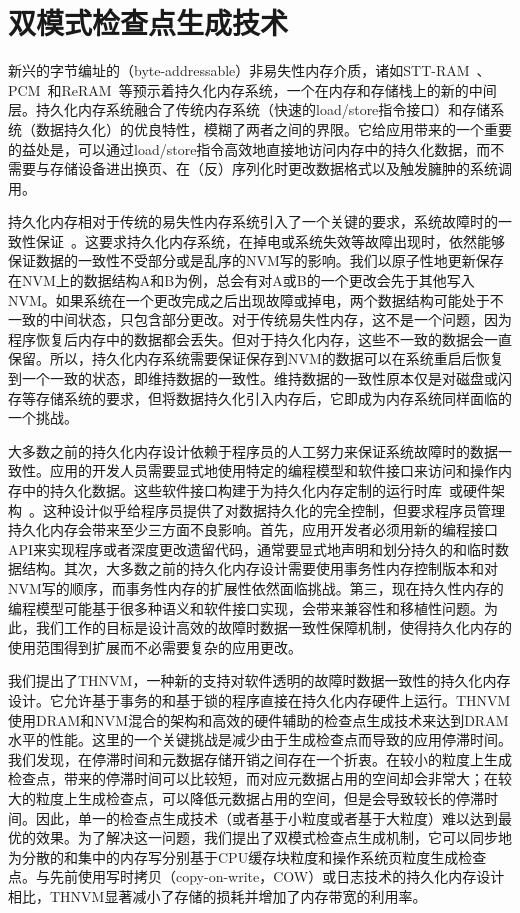 \chapter{双模式检查点生成技术}
\label{chap:thynvm}

新兴的字节编址的（byte-addressable）非易失性内存介质，诸如STT-RAM~\cite{4443191}、PCM~\cite{Raoux:2008:PRA}和ReRAM~\cite{5607274}等预示着持久化内存系统，一个在内存和存储栈上的新的中间层。持久化内存系统融合了传统内存系统（快速的load/store指令接口）和存储系统（数据持久化）的优良特性，模糊了两者之间的界限。它给应用带来的一个重要的益处是，可以通过load/store指令高效地直接地访问内存中的持久化数据，而不需要与存储设备进出换页、在（反）序列化时更改数据格式以及触发臃肿的系统调用。

持久化内存相对于传统的易失性内存系统引入了一个关键的要求，系统故障时的一致性保证~\cite{Lamb:1991:ODS,Copeland:1989:CSR,Shapiro:1999:EFC:319151.319163}。这要求持久化内存系统，在掉电或系统失效等故障出现时，依然能够保证数据的一致性不受部分或是乱序的NVM写的影响。我们以原子性地更新保存在NVM上的数据结构A和B为例，总会有对A或B的一个更改会先于其他写入NVM。如果系统在一个更改完成之后出现故障或掉电，两个数据结构可能处于不一致的中间状态，只包含部分更改。对于传统易失性内存，这不是一个问题，因为程序恢复后内存中的数据都会丢失。但对于持久化内存，这些不一致的数据会一直保留。所以，持久化内存系统需要保证保存到NVM的数据可以在系统重启后恢复到一个一致的状态，即维持数据的一致性。维持数据的一致性原本仅是对磁盘或闪存等存储系统的要求，但将数据持久化引入内存后，它即成为内存系统同样面临的一个挑战。

大多数之前的持久化内存设计依赖于程序员的人工努力来保证系统故障时的数据一致性。应用的开发人员需要显式地使用特定的编程模型和软件接口来访问和操作内存中的持久化数据。这些软件接口构建于为持久化内存定制的运行时库~\cite{Condit:2009:BIT:1629575.1629589,Volos:2011:MLP:1950365.1950379}或硬件架构~\cite{Zhao:2013:KCP:2540708.2540744}。这种设计似乎给程序员提供了对数据持久化的完全控制，但要求程序员管理持久化内存会带来至少三方面不良影响。首先，应用开发者必须用新的编程接口API来实现程序或者深度更改遗留代码，通常要显式地声明和划分持久的和临时数据结构。其次，大多数之前的持久化内存设计需要使用事务性内存控制版本和对NVM写的顺序，而事务性内存的扩展性依然面临挑战。第三，现在持久性内存的编程模型可能基于很多种语义和软件接口实现，会带来兼容性和移植性问题。为此，我们工作的目标是设计高效的故障时数据一致性保障机制，使得持久化内存的使用范围得到扩展而不必需要复杂的应用更改。

我们提出了THNVM，一种新的支持对软件透明的故障时数据一致性的持久化内存设计。它允许基于事务的和基于锁的程序直接在持久化内存硬件上运行。THNVM使用DRAM和NVM混合的架构和高效的硬件辅助的检查点生成技术来达到DRAM水平的性能。这里的一个关键挑战是减少由于生成检查点而导致的应用停滞时间。我们发现，在停滞时间和元数据存储开销之间存在一个折衷。在较小的粒度上生成检查点，带来的停滞时间可以比较短，而对应元数据占用的空间却会非常大；在较大的粒度上生成检查点，可以降低元数据占用的空间，但是会导致较长的停滞时间。因此，单一的检查点生成技术（或者基于小粒度或者基于大粒度）难以达到最优的效果。为了解决这一问题，我们提出了双模式检查点生成机制，它可以同步地为分散的和集中的内存写分别基于CPU缓存块粒度和操作系统页粒度生成检查点。与先前使用写时拷贝（copy-on-write，COW）或日志技术的持久化内存设计相比，THNVM显著减小了存储的损耗并增加了内存带宽的利用率。

